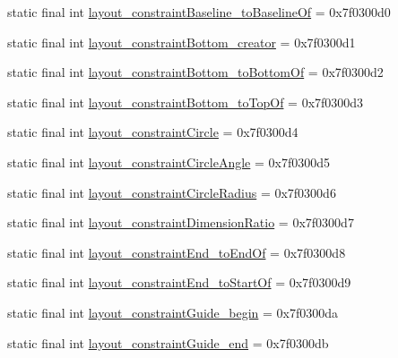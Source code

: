 \begin{DoxyCompactItemize}
\item 
static final int \mbox{\hyperlink{classandroid_1_1support_1_1constraint_1_1_r_1_1attr_a86f1f977d17bfb39e97e519869718a3e}{layout\+\_\+constraint\+Baseline\+\_\+to\+Baseline\+Of}} = 0x7f0300d0
\item 
static final int \mbox{\hyperlink{classandroid_1_1support_1_1constraint_1_1_r_1_1attr_a3e14c3b491d6d6ad68b192982cc2796c}{layout\+\_\+constraint\+Bottom\+\_\+creator}} = 0x7f0300d1
\item 
static final int \mbox{\hyperlink{classandroid_1_1support_1_1constraint_1_1_r_1_1attr_a2540c169c67181d51017f07909a3f5c6}{layout\+\_\+constraint\+Bottom\+\_\+to\+Bottom\+Of}} = 0x7f0300d2
\item 
static final int \mbox{\hyperlink{classandroid_1_1support_1_1constraint_1_1_r_1_1attr_a702b1a511230e9a24a3122757dfd8caa}{layout\+\_\+constraint\+Bottom\+\_\+to\+Top\+Of}} = 0x7f0300d3
\item 
static final int \mbox{\hyperlink{classandroid_1_1support_1_1constraint_1_1_r_1_1attr_a41bac7917de859450676d26ad0747710}{layout\+\_\+constraint\+Circle}} = 0x7f0300d4
\item 
static final int \mbox{\hyperlink{classandroid_1_1support_1_1constraint_1_1_r_1_1attr_a55787dc1e421de7180d5c0229e44bcc6}{layout\+\_\+constraint\+Circle\+Angle}} = 0x7f0300d5
\item 
static final int \mbox{\hyperlink{classandroid_1_1support_1_1constraint_1_1_r_1_1attr_ad99830688fd65f269fb12238c8474f03}{layout\+\_\+constraint\+Circle\+Radius}} = 0x7f0300d6
\item 
static final int \mbox{\hyperlink{classandroid_1_1support_1_1constraint_1_1_r_1_1attr_a2f8edb013be20eba0002747e7160c05d}{layout\+\_\+constraint\+Dimension\+Ratio}} = 0x7f0300d7
\item 
static final int \mbox{\hyperlink{classandroid_1_1support_1_1constraint_1_1_r_1_1attr_ac33072d697b98229d64e9c7a52cf2be7}{layout\+\_\+constraint\+End\+\_\+to\+End\+Of}} = 0x7f0300d8
\item 
static final int \mbox{\hyperlink{classandroid_1_1support_1_1constraint_1_1_r_1_1attr_a17a0995fff6b68fa1bd50d8b79655221}{layout\+\_\+constraint\+End\+\_\+to\+Start\+Of}} = 0x7f0300d9
\item 
static final int \mbox{\hyperlink{classandroid_1_1support_1_1constraint_1_1_r_1_1attr_a31c18d22856c2dedb40ec7e5ed548323}{layout\+\_\+constraint\+Guide\+\_\+begin}} = 0x7f0300da
\item 
static final int \mbox{\hyperlink{classandroid_1_1support_1_1constraint_1_1_r_1_1attr_a8fc60167fe4318760806ea3ab395c06a}{layout\+\_\+constraint\+Guide\+\_\+end}} = 0x7f0300db

\end{DoxyCompactItemize}
